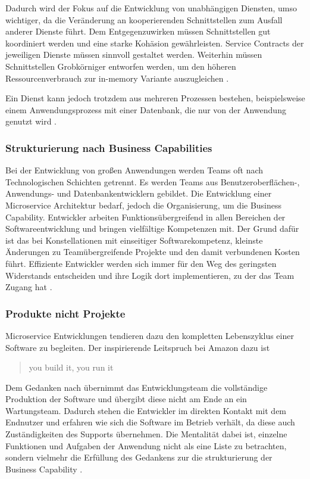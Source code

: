 Dadurch wird der Fokus auf die Entwicklung von unabhängigen Diensten, umso wichtiger, da die Veränderung an kooperierenden Schnittstellen zum Ausfall anderer Dienste führt. 
Dem Entgegenzuwirken müssen Schnittstellen gut koordiniert werden und eine starke Kohäsion gewährleisten. Service Contracts der jeweiligen Dienste müssen sinnvoll gestaltet werden. 
Weiterhin müssen Schnittstellen Grobkörniger entworfen werden, um den höheren Ressourcenverbrauch zur in-memory Variante auszugleichen \cite{FowlerMicroservice, BuildingMicroservicesNewman}. 

Ein Dienst kann jedoch trotzdem aus mehreren Prozessen bestehen, beispielsweise einem Anwendungsprozess mit einer Datenbank, die nur von der Anwendung genutzt wird \cite{FowlerMicroservice, BuildingMicroservicesNewman}.

\subsubsection{Strukturierung nach Business Capabilities}
Bei der Entwicklung von großen Anwendungen werden Teams oft nach Technologischen Schichten getrennt. 
Es werden Teams aus Benutzeroberflächen-, Anwendungs- und Datenbankentwicklern gebildet. 
Die Entwicklung einer Microservice Architektur bedarf, jedoch die Organisierung, um die Business Capability. 
Entwickler arbeiten Funktionsübergreifend in allen Bereichen der Softwareentwicklung und bringen vielfältige Kompetenzen mit.
Der Grund dafür ist das bei Konstellationen mit einseitiger Softwarekompetenz, kleinste Änderungen zu Teamübergreifende Projekte und den damit verbundenen Kosten führt.
Effiziente Entwickler werden sich immer für den Weg des geringsten Widerstands entscheiden und ihre Logik dort implementieren, zu der das Team Zugang hat \cite{FowlerMicroservice}.

\subsubsection{Produkte nicht Projekte}
Microservice Entwicklungen tendieren dazu den kompletten Lebenszyklus einer Software zu begleiten. 
Der inspirierende Leitspruch bei Amazon dazu ist \begin{quote}
  \glqq  you build it, you run it \grqq{} \cite{amazon}\end{quote} 
Dem Gedanken nach übernimmt das Entwicklungsteam die vollständige Produktion der Software und übergibt diese nicht am Ende an ein Wartungsteam. 
Dadurch stehen die Entwickler im direkten Kontakt mit dem Endnutzer und erfahren wie sich die Software im Betrieb verhält, da diese auch Zuständigkeiten des Supports übernehmen. 
Die Mentalität dabei ist, einzelne Funktionen und Aufgaben der Anwendung nicht als eine Liste zu betrachten, sondern vielmehr die Erfüllung des Gedankens zur die strukturierung der Business Capability \cite{FowlerMicroservice}.

